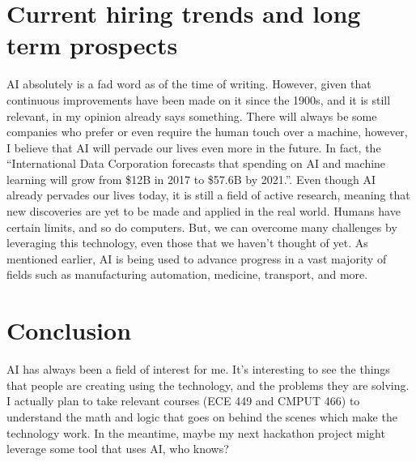 \documentclass[letterpaper,12pt]{article}
\begin{document}
\section{Current hiring trends and long term prospects}

AI absolutely is a fad word as of the time of writing. However, given that continuous improvements
have been made on it since the 1900s, and it is still relevant, in my opinion already says something.
There will always be some companies who prefer or even require the human touch
over a machine, however, I believe that AI will pervade our lives even more in the future.
In fact, the 
``International Data Corporation forecasts that spending on AI and machine learning will grow from \$12B in 2017 to \$57.6B by 2021.''.
\cite{forbesprojected}
Even though AI already pervades our lives today, 
it is still a field of active research\cite{uofaAI}, meaning that new
discoveries are yet to be made and applied in the real world.
Humans have certain limits, and so do computers. But, we can overcome many challenges by leveraging this technology,
even those that we haven't thought of yet. 
As mentioned earlier,
AI is being used to advance progress in a vast majority of fields
such as manufacturing automation, medicine, transport, and more.

\section{Conclusion}

AI has always been a field of interest for me.
It's interesting to see the things that people are creating
using the technology, and the problems they are solving.
I actually plan to take relevant courses (ECE 449 and CMPUT 466)
to understand the math and logic that goes on behind the scenes
which make the technology work. In the meantime, maybe my next
hackathon project might leverage some tool that uses AI, who knows?


\singlespacing
\nocite{*}
\printbibliography
% 
% 
\end{document}
